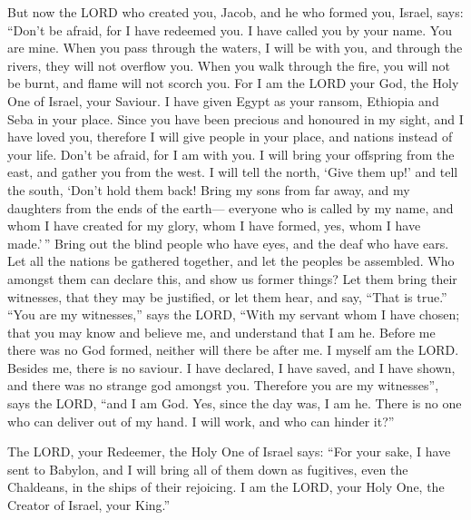 But now the LORD who created you, Jacob, and he who
formed you, Israel, says: ``Don't be afraid, for I have redeemed you. I
have called you by your name. You are mine.  When you pass
through the waters, I will be with you, and through the rivers, they
will not overflow you. When you walk through the fire, you will not be
burnt, and flame will not scorch you.  For I am the LORD
your God, the Holy One of Israel, your Saviour. I have given Egypt as
your ransom, Ethiopia and Seba in your place.  Since you
have been precious and honoured in my sight, and I have loved you,
therefore I will give people in your place, and nations instead of your
life.  Don't be afraid, for I am with you. I will bring
your offspring from the east, and gather you from the west.
 I will tell the north, `Give them up!' and tell the
south, `Don't hold them back! Bring my sons from far away, and my
daughters from the ends of the earth---  everyone who is
called by my name, and whom I have created for my glory, whom I have
formed, yes, whom I have made.'\,''  Bring out the blind
people who have eyes, and the deaf who have ears.  Let all
the nations be gathered together, and let the peoples be assembled. Who
amongst them can declare this, and show us former things? Let them bring
their witnesses, that they may be justified, or let them hear, and say,
``That is true.''  ``You are my witnesses,'' says the
LORD, ``With my servant whom I have chosen; that you may know and
believe me, and understand that I am he. Before me there was no God
formed, neither will there be after me.  I myself am the
LORD. Besides me, there is no saviour.  I have declared,
I have saved, and I have shown, and there was no strange god amongst
you. Therefore you are my witnesses'', says the LORD, ``and I am God.
 Yes, since the day was, I am he. There is no one who can
deliver out of my hand. I will work, and who can hinder it?''

 The LORD, your Redeemer, the Holy One of Israel says:
``For your sake, I have sent to Babylon, and I will bring all of them
down as fugitives, even the Chaldeans, in the ships of their rejoicing.
 I am the LORD, your Holy One, the Creator of Israel,
your King.''

